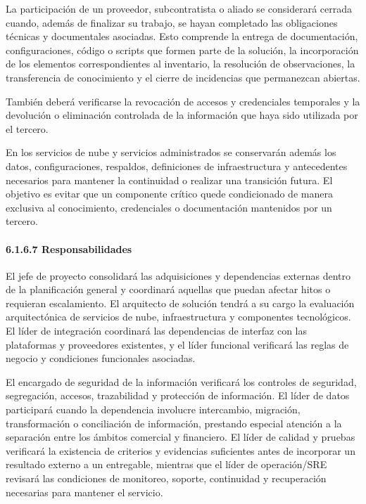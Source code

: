 \documentclass[11pt]{article}
\begin{document}
La participación de un proveedor, subcontratista o aliado se considerará cerrada cuando, además de finalizar su trabajo, se hayan completado las obligaciones técnicas y documentales asociadas. Esto comprende la entrega de documentación, configuraciones, código o scripts que formen parte de la solución, la incorporación de los elementos correspondientes al inventario, la resolución de observaciones, la transferencia de conocimiento y el cierre de incidencias que permanezcan abiertas.

También deberá verificarse la revocación de accesos y credenciales
temporales y la devolución o eliminación controlada de la información
que haya sido utilizada por el tercero.

En los servicios de nube y servicios administrados se conservarán además
los datos, configuraciones, respaldos, definiciones de infraestructura y
antecedentes necesarios para mantener la continuidad o realizar una
transición futura. El objetivo es evitar que un componente crítico quede
condicionado de manera exclusiva al conocimiento, credenciales o
documentación mantenidos por un tercero.

\paragraph{6.1.6.7 Responsabilidades}\label{6-1-6-7-responsabilidades}

El jefe de proyecto consolidará las adquisiciones y dependencias externas dentro de la planificación general y coordinará aquellas que puedan afectar hitos o requieran escalamiento. El arquitecto de solución tendrá a su cargo la evaluación arquitectónica de servicios de nube, infraestructura y componentes tecnológicos. El líder de integración coordinará las dependencias de interfaz con las plataformas y proveedores existentes, y el líder funcional verificará las reglas de negocio y condiciones funcionales asociadas.

El encargado de seguridad de la información verificará los controles de
seguridad, segregación, accesos, trazabilidad y protección de
información. El líder de datos participará cuando la dependencia
involucre intercambio, migración, transformación o conciliación de
información, prestando especial atención a la separación entre los
ámbitos comercial y financiero. El líder de calidad y pruebas verificará
la existencia de criterios y evidencias suficientes antes de incorporar
un resultado externo a un entregable, mientras que el líder de
operación/SRE revisará las condiciones de monitoreo, soporte,
continuidad y recuperación necesarias para mantener el servicio.
\end{document}
